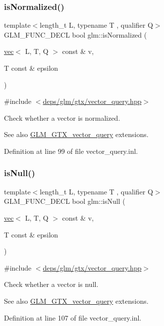 \subsubsection{\texorpdfstring{is\+Normalized()}{isNormalized()}}
{\footnotesize\ttfamily template$<$length\+\_\+t L, typename T , qualifier Q$>$ \\
G\+L\+M\+\_\+\+F\+U\+N\+C\+\_\+\+D\+E\+CL bool glm\+::is\+Normalized (\begin{DoxyParamCaption}\item[{\hyperlink{structglm_1_1vec}{vec}$<$ L, T, Q $>$ const \&}]{v,  }\item[{T const \&}]{epsilon }\end{DoxyParamCaption})}



{\ttfamily \#include $<$\hyperlink{vector__query_8hpp}{deps/glm/gtx/vector\+\_\+query.\+hpp}$>$}

Check whether a vector is normalized. \begin{DoxySeeAlso}{See also}
\hyperlink{group__gtx__vector__query}{G\+L\+M\+\_\+\+G\+T\+X\+\_\+vector\+\_\+query} extensions. 
\end{DoxySeeAlso}


Definition at line 99 of file vector\+\_\+query.\+inl.

\mbox{\label{group__gtx__vector__query_gab4a3637dbcb4bb42dc55caea7a1e0495}} 
\subsubsection{\texorpdfstring{is\+Null()}{isNull()}}
{\footnotesize\ttfamily template$<$length\+\_\+t L, typename T , qualifier Q$>$ \\
G\+L\+M\+\_\+\+F\+U\+N\+C\+\_\+\+D\+E\+CL bool glm\+::is\+Null (\begin{DoxyParamCaption}\item[{\hyperlink{structglm_1_1vec}{vec}$<$ L, T, Q $>$ const \&}]{v,  }\item[{T const \&}]{epsilon }\end{DoxyParamCaption})}



{\ttfamily \#include $<$\hyperlink{vector__query_8hpp}{deps/glm/gtx/vector\+\_\+query.\+hpp}$>$}

Check whether a vector is null. \begin{DoxySeeAlso}{See also}
\hyperlink{group__gtx__vector__query}{G\+L\+M\+\_\+\+G\+T\+X\+\_\+vector\+\_\+query} extensions. 
\end{DoxySeeAlso}


Definition at line 107 of file vector\+\_\+query.\+inl.

